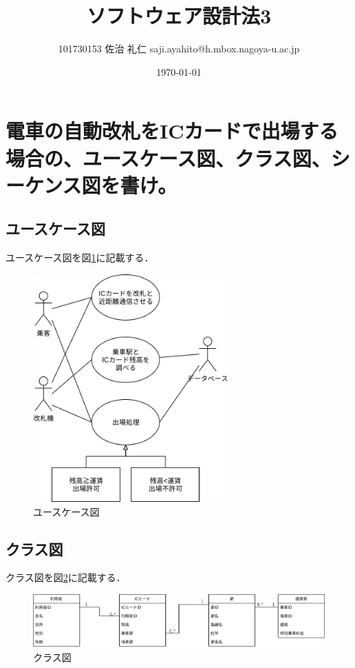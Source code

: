\documentclass[uplatex]{jsarticle}
\title{ソフトウェア設計法3}
\author{101730153 佐治 礼仁 saji.ayahito@h.mbox.nagoya-u.ac.jp}
\date{\today}
\begin{document}
\maketitle
\section{電車の自動改札をICカードで出場する場合の、ユースケース図、クラス図、シーケンス図を書け。}
\subsection{ユースケース図}
ユースケース図を図\ref{fig:usecase-diagram}に記載する．
\begin{figure}[htbp]
  \begin{center}
    \includegraphics[clip,width=7.5cm]{figures/usecase-d.png}
    \caption{ユースケース図}
    \label{fig:usecase-diagram}
  \end{center}
\end{figure}
\subsection{クラス図}
クラス図を図\ref{fig:class-diagram}に記載する．
\begin{figure}[htbp]
  \begin{center}
    \includegraphics[clip,width=12.0cm]{figures/class-d.png}
    \caption{クラス図}
    \label{fig:class-diagram}
  \end{center}
\end{figure}
\end{document}
